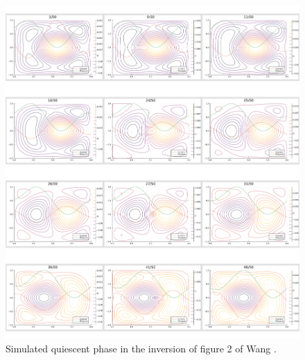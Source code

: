 \begin{figure}[h!]
    \centering
    \includegraphics*[scale=0.24]{imgs/c4/simulated-inversion-fig-2-quiescent-collage.png}
    \caption{Simulated quiescent phase in the inversion of figure 2 of Wang \cite{wang-analytic-solution}.}
    \label{fig-2-inversion-quiescent}
\end{figure}